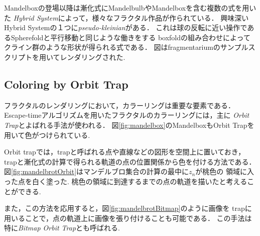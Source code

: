 Mandelboxの登場以降は漸化式にMandelbulbやMandelboxを含む複数の式を用いた
{\it Hybrid System}によって，様々なフラクタル作品が作られている．
興味深いHybrid Systemの１つに{\it pseudo-kleinian}がある．
これは球の反転に近い操作であるSpherefoldと平行移動と同じような働きをする
boxfoldの組み合わせによってクライン群のような形状が得られる式である．
図はfragmentariumのサンプルスクリプトを用いてレンダリングされた.

\subsection{Coloring by Orbit Trap}

フラクタルのレンダリングにおいて，カラーリングは重要な要素である．
Escape-timeアルゴリズムを用いたフラクタルのカラーリングには，主に{\it
Orbit Trap}とよばれる手法が使われる．
図\ref{fig:mandelbox}のMandelboxもOrbit Trapを用いて色がつけられている.

Orbit trapでは，trapと呼ばれる点や直線などの図形を空間上に置いておき，
trapと漸化式の計算で得られる軌道の点の位置関係から色を付ける方法である．
図\ref{fig:mandelbrotOrbit}はマンデルブロ集合の計算の最中に$z_n$が桃色の
領域に入った点を白く塗った.
桃色の領域に到達するまでの点の軌道を描いたと考えることができる.

また，この方法を応用すると，図\ref{fig:mandelbrotBitmap}のように画像を
trapに用いることで，点の軌道上に画像を張り付けることも可能である．
この手法は特に{\it Bitmap Orbit Trap}とも呼ばれる.

